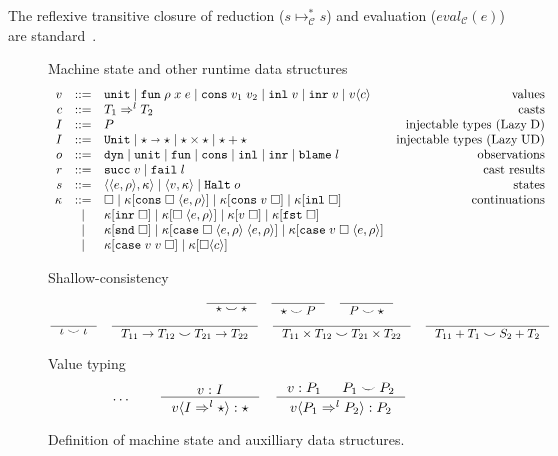 \documentclass[acmsmall,review,anonymous]{acmart}\settopmatter{printfolios=true,printccs=false,printacmref=false}
\newcommand{\stxrule}[3]{#1 & ::= & #3 & \text{#2}\\}
\newcommand{\stxrulecont}[1]{& | & #1 & \\}
\newcommand{\plus}[0]{+}
\newcommand{\lazyUD}{Lazy\;UD}
\newcommand{\lazyD}{Lazy\;D}
\newcommand{\sOOinspect}[3]{\langle\langle#1,#2\rangle,#3\rangle}
\newcommand{\sOOreturn}[2]{\langle#1,#2\rangle}
\newcommand{\sOOhalt}[1]{\mathtt{Halt} \; #1}
\newcommand{\TOOdyn}[0]{\star}
\newcommand{\POOunit}[0]{\mathtt{Unit}}
\newcommand{\POOfun}[2]{#1 \shortrightarrow #2}
\newcommand{\cOOcast}[3]{#1 \Rightarrow^{#2} #3}
\newcommand{\oOOinj}{\mathtt{dyn}}
\newcommand{\oOOsole}{\mathtt{unit}}
\newcommand{\oOOfun}{\mathtt{fun}}
\newcommand{\oOOcons}{\mathtt{cons}}
\newcommand{\oOOinl}{\mathtt{inl}}
\newcommand{\oOOinr}{\mathtt{inr}}
\newcommand{\oOOblame}[1]{\mathtt{blame} \; #1}
\newcommand{\vOOcast}[2]{#1\langle#2\rangle}
\newcommand{\vOOfun}[3]{\mathtt{fun} \; #1 \; #2 \; #3}
\newcommand{\vOOtt}[0]{\mathtt{unit}}
\newcommand{\vOOcons}[2]{\mathtt{cons}\;#1\;#2}
\newcommand{\vOOinl}[1]{\mathtt{inl}\;#1}
\newcommand{\vOOinr}[1]{\mathtt{inr}\;#1}
\newcommand{\rOOsucc}[1]{\mathtt{succ}\;#1}
\newcommand{\rOOfail}[1]{\mathtt{fail}\;#1}
\newcommand{\kOOmt}[0]{\square}
\newcommand{\kOOconsI}[3]{#3[\mathtt{cons} \; \square \; \langle#1,#2\rangle ]}
\newcommand{\kOOconsII}[2]{#2[\mathtt{cons} \; #1 \; \square]}
\newcommand{\kOOinl}[1]{#1[\mathtt{inl} \; \square]}
\newcommand{\kOOinr}[1]{#1[\mathtt{inr} \; \square]}
\newcommand{\kOOappI}[3]{
	#3[\square \; \langle#1,#2\rangle ]
}
\newcommand{\kOOappII}[2]{
	#2[#1 \; \square]}
\newcommand{\kOOcar}[1]{#1[\mathtt{fst} \; \square]}
\newcommand{\kOOcdr}[1]{#1[\mathtt{snd} \; \square]}
\newcommand{\kOOcaseI}[4]{
	#4[\mathtt{case} \; \square \; \langle#1,#3\rangle \; \langle#2,#3\rangle ]}
\newcommand{\kOOcaseII}[4]{
	#4[\mathtt{case} \; #1 \; \square \; \langle#2,#3\rangle ]}
\newcommand{\kOOcaseIII}[3]{
	#3[\mathtt{case} \; #1 \; #2 \; \square]}
\newcommand{\kOOcast}[2]{
	#2[\square \langle #1 \rangle]}
\newcommand{\judgeCreduceTrans}[2]{#1 \longmapsto_{\mathcal{C}}^{*} #2}
\begin{document}
The reflexive transitive closure of reduction ($\judgeCreduceTrans{s}{s}$) and 
evaluation ($eval_\mathcal{C}(e)$)
are standard~\citep{felleisen03:_pllc}.


\begin{figure}
  Machine state and other runtime data structures
  \[
  \begin{array}{rclr}
	\stxrule{v}{values}{
		\vOOtt{} \mid
		\vOOfun{\rho}{x}{e} \mid
		\vOOcons{v_1}{v_2} \mid
		\vOOinl{v} \mid
		\vOOinr{v} \mid		
		\vOOcast{v}{c}
	}
	\stxrule{c}{casts}{
		\cOOcast{T_1}{l}{T_2}
	}
	\stxrule{I}{injectable types (\lazyD)}{
		P
	}
	\stxrule{I}{injectable types (\lazyUD)}{
		\POOunit \mid
		\POOfun{\star}{\star} \mid
		\star \times \star \mid
		\star + \star
	}
	\stxrule{o}{observations}{
		\oOOinj \mid
		\oOOsole \mid
		\oOOfun \mid
		\oOOcons \mid
		\oOOinl \mid
		\oOOinr \mid
		\oOOblame{l}
	}
	\stxrule{r}{cast results}{
		\rOOsucc{v} \mid
		\rOOfail{l}
	}
	\stxrule{s}{states}{
		\sOOinspect{e}{\rho}{\kappa} \mid{}
		\sOOreturn{v}{\kappa} \mid{}
		\sOOhalt{o}
	}
	\stxrule{\kappa}{continuations}{
		\kOOmt \mid
		\kOOconsI{e}{\rho}{\kappa} \mid
		\kOOconsII{v}{\kappa} \mid
		\kOOinl{\kappa}
	}
	\stxrulecont{
		\kOOinr{\kappa} \mid
		\kOOappI{e}{\rho}{\kappa} \mid
		\kOOappII{v}{\kappa} \mid
		\kOOcar{\kappa}
	}
	\stxrulecont{	
		\kOOcdr{\kappa}\mid
		\kOOcaseI{e}{e}{\rho}{\kappa}\mid
		\kOOcaseII{v}{e}{\rho}{\kappa}
	}
	\stxrulecont{
		\kOOcaseIII{v}{v}{\kappa} \mid
		\kOOcast{c}{\kappa}
	}
  \end{array}
  \]

        Shallow-consistency
	\begin{gather*}
	\inference{}{
		\star \smile \star
	} \quad
	\inference{}{
		\star \smile P
	} \quad
	\inference{}{
		P \smile \star
	} \\
	\inference{}{
		\iota \smile \iota
	} \quad
	\inference{}{
		T_{11} \rightarrow T_{12} \smile T_{21} \rightarrow T_{22}
	} \quad
	\inference{}{
		T_{11} \times T_{12} \smile T_{21} \times T_{22}
	} \quad
	\inference{}{
	T_{11} \plus T_1 \smile S_2 \plus T_2
	}
	\end{gather*}
	
	Value typing 
	\begin{gather*}
	\dots \qquad
	\inference{
		v : I
	}{
		\vOOcast{v}{\cOOcast{I}{l}{\TOOdyn}} : \TOOdyn
	}
	\quad
	\inference{
		v : P_1 &
		P_1 \smile P_2
	}{
		\vOOcast{v}{\cOOcast{P_1}{l}{P_2}} : P_2
	}
	\end{gather*}
        \caption{Definition of machine state and auxilliary data
          structures.}
        \label{fig:state}
\end{figure}
\end{document}
